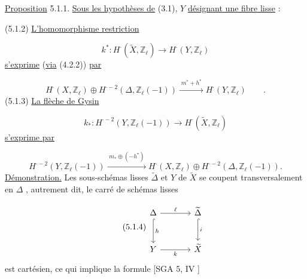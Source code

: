 
\underline{Proposition} 5.1.1. \underline{Sous les hypothèses de} (3.1), $Y$ \underline{désignant une fibre lisse} :

(5.1.2) \quad \underline{L'homomorphisme restriction}

\begin{equation*}
k^* : H^\cdot(\widetilde{X},\mathbb{Z}_\ell) \longrightarrow H^\cdot(Y,\mathbb{Z}_\ell)
\end{equation*}
\underline{s'exprime} (\underline{via} (4.2.2)) \underline{par}

\begin{equation*}
H^\cdot(X,\mathbb{Z}_\ell) \oplus H^{\cdot-2}(\Delta,\mathbb{Z}_\ell(-1)) \xrightarrow{\;m^*+h^*\;} H^\cdot(Y,\mathbb{Z}_\ell) \qquad .
\end{equation*}
(5.1.3) \quad \underline{La flèche de Gysin}

\begin{equation*}
k_* : H^{\cdot-2}(Y,\mathbb{Z}_\ell(-1)) \longrightarrow H^\cdot(\widetilde{X},\mathbb{Z}_\ell)
\end{equation*}
\underline{s'exprime par}

\begin{equation*}
H^{\cdot-2}(Y,\mathbb{Z}_\ell(-1)) \xrightarrow{\;m_* \oplus (-h^*)\;} H^\cdot(X,\mathbb{Z}_\ell) \oplus H^{\cdot-2}(\Delta,\mathbb{Z}_\ell(-1)).
\end{equation*}
\underline{Démonstration.} Les sous-schémas lisses $\widetilde{\Delta}$ et $Y$ de $\widetilde{X}$ se coupent transversalement en $\Delta$ , autrement dit, le carré de schémas lisses

\begin{equation}\tag{5.1.4}
\begin{tikzcd}[column sep=large, row sep=large]
\Delta \arrow[r, "\ell"] \arrow[d, hook, "h"] & \widetilde{\Delta} \arrow[d, hook, "i"] \\
Y \arrow[r, "k"'] & \widetilde{X}
\end{tikzcd}
\end{equation}
est cartésien, ce qui implique la formule [SGA 5, IV \hspace{2.2cm} ]

